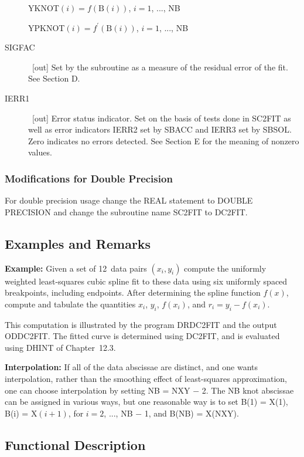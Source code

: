 \documentclass[twoside]{MATH77}
\begin{document}
\begin{description}
YKNOT$(i)=f(\text{B}(i))$, $i=1$, ..., NB

YPKNOT$(i)=f^{\prime }(\text{B}(i))$, $i=1$, ..., NB

\item[SIGFAC]  \ [out] Set by the subroutine as a measure of the residual
error of the fit. See Section D.

\item[IERR1]  \ [out] Error status indicator. Set on the basis of tests done
in SC2FIT as well as error indicators IERR2 set by SBACC and IERR3 set by
SBSOL. Zero indicates no errors detected. See Section E for the meaning of
nonzero values.
\end{description}
\subsubsection{Modifications for Double Precision}

For double precision usage change the REAL statement to DOUBLE PRECISION and
change the subroutine name SC2FIT to DC2FIT.

\subsection{Examples and Remarks}

{\bf Example:} Given a set of 12~data pairs $(x_i,y_i)$ compute the
uniformly weighted least-squares cubic spline fit to these data using six
uniformly spaced breakpoints, including endpoints. After determining the
spline function $f(x)$, compute and tabulate the quantities $x_i$, $y_i$, $%
f(x_i)$, and $r_i = y_i - f(x_i).$

This computation is illustrated by the program DRDC2FIT and the output
ODDC2FIT. The fitted curve is determined using DC2FIT, and is evaluated
using DHINT of Chapter~12.3.

{\bf Interpolation:} If all of the data abscissae are distinct, and one wants
interpolation, rather than the smoothing effect of least-squares
approximation, one can choose interpolation by setting NB = NXY $-$ 2. The
NB knot abscissae can be assigned in various ways, but one reasonable way is
to set B(1) = X(1), B(i) = X$(i+1)$, for $i = 2$, ..., NB $-$ 1, and B(NB) =
X(NXY).

\subsection{Functional Description}
\end{document}
